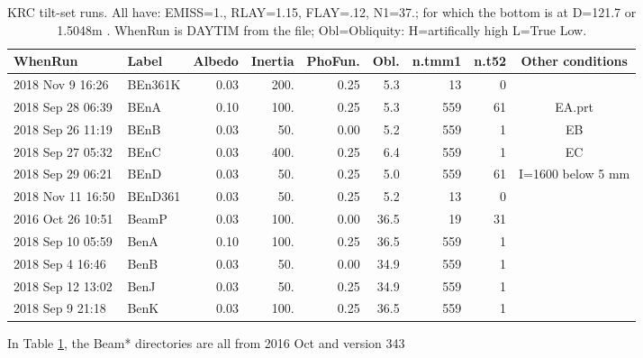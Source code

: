 \documentclass{article}
\begin{document}
\begin{table} [!h]
\caption[KRC tilt-set runs]{KRC tilt-set runs. All have: EMISS=1., RLAY=1.15, FLAY=.12, N1=37.; for which the bottom is at  D=121.7 or 1.5048m . WhenRun is DAYTIM from the file; Obl=Obliquity: H=artifically high  L=True Low. }
\label{runt}
\begin{center}
\begin{tabular}{| l l   r  r  r r | r r | c | } \hline \hline
WhenRun & Label & Albedo & Inertia & PhoFun. & Obl. & n.tmm1 & n.t52 & Other conditions  \\  \hline


2018 Nov  9 16:26 & BEn361K & 0.03 &   200. & 0.25 &  5.3 &   13 &   0 & \\
2018 Sep 28 06:39 &    BEnA & 0.10 &   100. & 0.25 &  5.3 &  559 &  61 & EA.prt \\
2018 Sep 26 11:19 &    BEnB & 0.03 &    50. & 0.00 &  5.2 &  559 &   1 & EB \\
2018 Sep 27 05:32 &    BEnC & 0.03 &   400. & 0.25 &  6.4 &  559 &   1 & EC \\
2018 Sep 29 06:21 &    BEnD & 0.03 &    50. & 0.25 &  5.0 &  559 &  61 & I=1600 below 5 mm \\
2018 Nov 11 16:50 & BEnD361 & 0.03 &    50. & 0.25 &  5.2 &   13 &   0 & \\
2016 Oct 26 10:51 &   BeamP & 0.03 &   100. & 0.00 & 36.5 &   19 &  31 & \\
2018 Sep 10 05:59 &    BenA & 0.10 &   100. & 0.25 & 36.5 &  559 &   1 & \\
2018 Sep  4 16:46 &    BenB & 0.03 &    50. & 0.00 & 34.9 &  559 &   1 & \\
2018 Sep 12 13:02 &    BenJ & 0.03 &    50. & 0.25 & 34.9 &  559 &   1 & \\
2018 Sep  9 21:18 &    BenK & 0.03 &   100. & 0.25 & 36.5 &  559 &   1 & \\
 \hline
\end{tabular} \end{center}
\end{table}

In Table \ref{runt}, the Beam* directories are all from 2016 Oct and version 343
\end{document}
